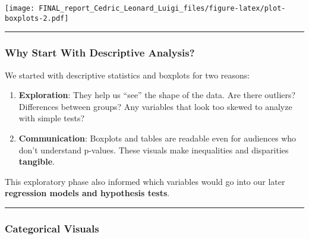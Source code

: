 \documentclass[
]{article}
\begin{document}
\texttt{[image: FINAL\_report\_Cedric\_Leonard\_Luigi\_files/figure-latex/plot-boxplots-2.pdf]}

\begin{center}\rule{0.5\linewidth}{0.5pt}\end{center}

\subsubsection{Why Start With Descriptive
Analysis?}\label{why-start-with-descriptive-analysis}

We started with descriptive statistics and boxplots for two reasons:

\begin{enumerate}
\def\labelenumi{\arabic{enumi}.}
\item
  \textbf{Exploration}: They help us ``see'' the shape of the data. Are
  there outliers? Differences between groups? Any variables that look
  too skewed to analyze with simple tests?
\item
  \textbf{Communication}: Boxplots and tables are readable even for
  audiences who don't understand p-values. These visuals make
  inequalities and disparities \textbf{tangible}.
\end{enumerate}

This exploratory phase also informed which variables would go into our
later \textbf{regression models and hypothesis tests}.

\begin{center}\rule{0.5\linewidth}{0.5pt}\end{center}

\subsubsection{Categorical Visuals}\label{categorical-visuals}
\end{document}
